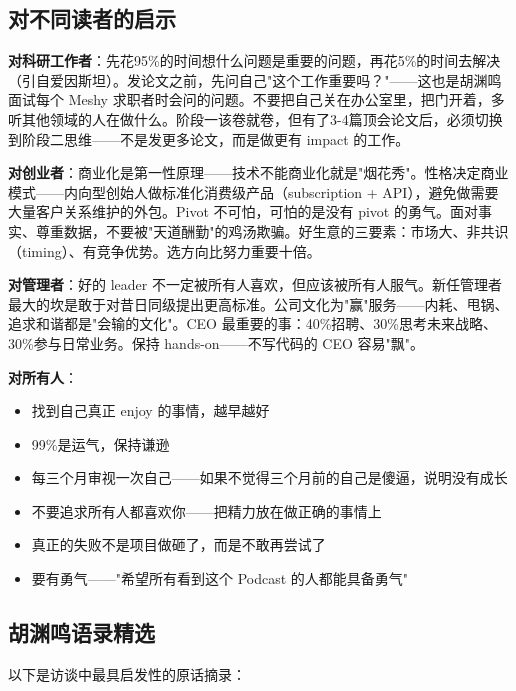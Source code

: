 \documentclass[a4paper]{article}
\begin{document}
\subsection{对不同读者的启示}

\textbf{对科研工作者}：先花95\%的时间想什么问题是重要的问题，再花5\%的时间去解决（引自爱因斯坦）。发论文之前，先问自己"这个工作重要吗？"——这也是胡渊鸣面试每个 Meshy 求职者时会问的问题。不要把自己关在办公室里，把门开着，多听其他领域的人在做什么。阶段一该卷就卷，但有了3-4篇顶会论文后，必须切换到阶段二思维——不是发更多论文，而是做更有 impact 的工作。

\textbf{对创业者}：商业化是第一性原理——技术不能商业化就是"烟花秀"。性格决定商业模式——内向型创始人做标准化消费级产品（subscription + API），避免做需要大量客户关系维护的外包。Pivot 不可怕，可怕的是没有 pivot 的勇气。面对事实、尊重数据，不要被"天道酬勤"的鸡汤欺骗。好生意的三要素：市场大、非共识（timing）、有竞争优势。选方向比努力重要十倍。

\textbf{对管理者}：好的 leader 不一定被所有人喜欢，但应该被所有人服气。新任管理者最大的坎是敢于对昔日同级提出更高标准。公司文化为"赢"服务——内耗、甩锅、追求和谐都是"会输的文化"。CEO 最重要的事：40\%招聘、30\%思考未来战略、30\%参与日常业务。保持 hands-on——不写代码的 CEO 容易"飘"。

\textbf{对所有人}：
\begin{itemize}
\item 找到自己真正 enjoy 的事情，越早越好
\item 99\%是运气，保持谦逊
\item 每三个月审视一次自己——如果不觉得三个月前的自己是傻逼，说明没有成长
\item 不要追求所有人都喜欢你——把精力放在做正确的事情上
\item 真正的失败不是项目做砸了，而是不敢再尝试了
\item 要有勇气——"希望所有看到这个 Podcast 的人都能具备勇气"
\end{itemize}

\subsection{胡渊鸣语录精选}

以下是访谈中最具启发性的原话摘录：
\end{document}
